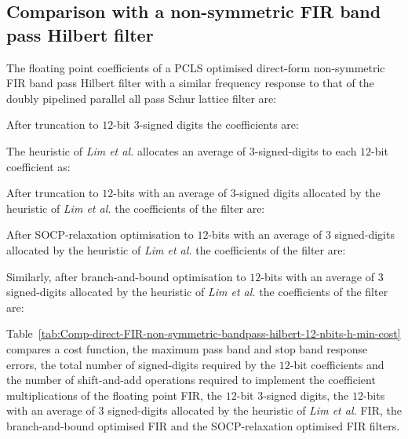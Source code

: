 \documentclass[a4paper,twoside,10pt,english]{article}
\begin{document}
\subsection{Comparison with a non-symmetric FIR band pass  Hilbert filter}
The floating point coefficients of a PCLS optimised direct-form
non-symmetric FIR band pass Hilbert filter with a similar frequency
response to that of the doubly pipelined parallel all pass Schur lattice
filter are:
\begin{small}

\end{small}
After truncation to $12$-bit $3$-signed digits the coefficients are:
\begin{small}

\end{small}
The heuristic of \emph{Lim et al.} allocates an average of $3$-signed-digits
to each $12$-bit coefficient as:
\begin{small}

\end{small}
After truncation to $12$-bits with an average of $3$-signed digits allocated
by the heuristic of \emph{Lim et al.} the coefficients of the filter
are:
\begin{small}

\end{small}
After SOCP-relaxation optimisation to $12$-bits with an
average of $3$ signed-digits allocated by the heuristic of \emph{Lim et al.}
the coefficients of the filter are:
\begin{small}

\end{small}
Similarly, after branch-and-bound optimisation to $12$-bits with an
average of $3$ signed-digits allocated by the heuristic of \emph{Lim et al.}
the coefficients of the filter are:
\begin{small}

\end{small}

Table~\ref{tab:Comp-direct-FIR-non-symmetric-bandpass-hilbert-12-nbits-h-min-cost}
compares a cost function, the maximum pass band and stop band response errors,
the total number of signed-digits required by the $12$-bit coefficients and the
number of shift-and-add operations required to implement the coefficient
multiplications of the floating point FIR, the $12$-bit $3$-signed digits, the
$12$-bits with an average of $3$ signed-digits allocated by the heuristic of
\emph{Lim et al.} FIR, the branch-and-bound optimised FIR and the
SOCP-relaxation optimised FIR filters.
\end{document}

